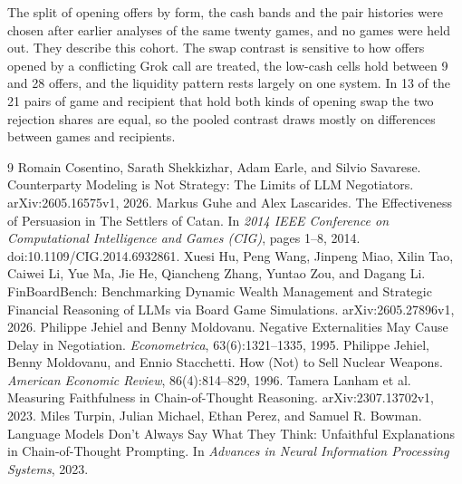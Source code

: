 \documentclass[11pt,letterpaper]{article}
\begin{document}
The split of opening offers by form, the cash bands and the pair histories were chosen after earlier analyses of the same twenty games, and no games were held out. They describe this cohort. The swap contrast is sensitive to how offers opened by a conflicting Grok call are treated, the low-cash cells hold between 9 and 28 offers, and the liquidity pattern rests largely on one system. In 13 of the 21 pairs of game and recipient that hold both kinds of opening swap the two rejection shares are equal, so the pooled contrast draws mostly on differences between games and recipients.

\begin{thebibliography}{9}\footnotesize\setlength{\itemsep}{0pt}\setlength{\parskip}{0pt}
 Romain Cosentino, Sarath Shekkizhar, Adam Earle, and Silvio Savarese. Counterparty Modeling is Not Strategy: The Limits of LLM Negotiators. arXiv:2605.16575v1, 2026.
 Markus Guhe and Alex Lascarides. The Effectiveness of Persuasion in The Settlers of Catan. In \emph{2014 IEEE Conference on Computational Intelligence and Games (CIG)}, pages 1--8, 2014. doi:10.1109/CIG.2014.6932861.
 Xuesi Hu, Peng Wang, Jinpeng Miao, Xilin Tao, Caiwei Li, Yue Ma, Jie He, Qiancheng Zhang, Yuntao Zou, and Dagang Li. FinBoardBench: Benchmarking Dynamic Wealth Management and Strategic Financial Reasoning of LLMs via Board Game Simulations. arXiv:2605.27896v1, 2026.
 Philippe Jehiel and Benny Moldovanu. Negative Externalities May Cause Delay in Negotiation. \emph{Econometrica}, 63(6):1321--1335, 1995.
 Philippe Jehiel, Benny Moldovanu, and Ennio Stacchetti. How (Not) to Sell Nuclear Weapons. \emph{American Economic Review}, 86(4):814--829, 1996.
 Tamera Lanham et al. Measuring Faithfulness in Chain-of-Thought Reasoning. arXiv:2307.13702v1, 2023.
 Miles Turpin, Julian Michael, Ethan Perez, and Samuel R. Bowman. Language Models Don't Always Say What They Think: Unfaithful Explanations in Chain-of-Thought Prompting. In \emph{Advances in Neural Information Processing Systems}, 2023.
\end{thebibliography}
\end{document}
